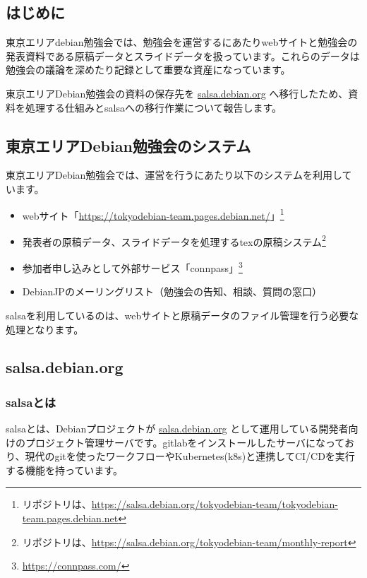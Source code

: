 \documentclass[mingoth,a4paper]{jsarticle}
\begin{document}
\subsection{はじめに}

東京エリアdebian勉強会では、勉強会を運営するにあたりwebサイトと勉強会の発表資料である原稿データとスライドデータを扱っています。これらのデータは勉強会の議論を深めたり記録として重要な資産になっています。


東京エリアDebian勉強会の資料の保存先を \url{salsa.debian.org} へ移行したため、資料を処理する仕組みとsalsaへの移行作業について報告します。


\subsection{東京エリアDebian勉強会のシステム}

東京エリアDebian勉強会では、運営を行うにあたり以下のシステムを利用しています。

\begin{itemize}
  \item webサイト「\url{https://tokyodebian-team.pages.debian.net/}」\footnote{リポジトリは、\url{https://salsa.debian.org/tokyodebian-team/tokyodebian-team.pages.debian.net}}
  \item 発表者の原稿データ、スライドデータを処理するtexの原稿システム\footnote{リポジトリは、\url{https://salsa.debian.org/tokyodebian-team/monthly-report}}
  \item 参加者申し込みとして外部サービス「connpass」\footnote{\url{https://connpass.com/}}
  \item DebianJPのメーリングリスト（勉強会の告知、相談、質問の窓口）
\end{itemize}


salsaを利用しているのは、webサイトと原稿データのファイル管理を行う必要な処理となります。


\subsection{salsa.debian.org}

\subsubsection{salsaとは}

salsaとは、Debianプロジェクトが \url{salsa.debian.org} として運用している開発者向けのプロジェクト管理サーバです。gitlabをインストールしたサーバになっており、現代のgitを使ったワークフローやKubernetes(k8s)と連携してCI/CDを実行する機能を持っています。
\end{document}
